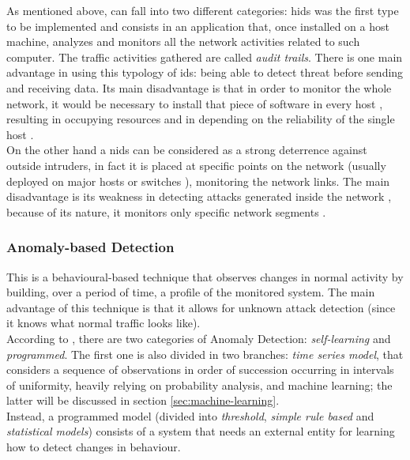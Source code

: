 As mentioned above,  can fall into two different categories: \gls{hids} was the first type to be implemented \cite{Debar1999} and consists in an application that, once installed on a host machine, analyzes and monitors all the network activities related to such computer. The traffic activities gathered are called \textit{audit trails}. There is one main advantage in using this typology of \gls{ids}: being able to detect threat before sending and receiving data. Its main disadvantage is that in order to monitor the whole network, it would be necessary to install that piece of software in every host \cite{Hodo2017}, resulting in occupying resources and in depending on the reliability of the single host \cite{Liu2019}. \\ On the other hand a \gls{nids} can be considered as a strong deterrence against outside intruders, in fact it is placed at specific points on the network (usually deployed on major hosts or switches \cite{Liu2019}), monitoring the network links. The main disadvantage is its weakness in detecting attacks generated inside the network \cite{Hodo2017}, because of its nature, it monitors only specific network segments \cite{Liu2019}.

\subsubsection{Anomaly-based Detection}
\label{subsubsec:anomaly-detection}

This is a behavioural-based technique that observes changes in normal activity by building, over a period of time, a profile of the monitored system. The main advantage of this technique is that it allows for unknown attack detection (since it knows what normal traffic looks like). \\ According to \cite{Hodo2017}, there are two categories of Anomaly Detection: \textit{self-learning} and \textit{programmed}. The first one is also divided in two branches: \textit{time series model}, that considers a sequence of observations in order of succession occurring in intervals of uniformity, heavily relying on probability analysis, and machine learning; the latter  will be discussed in section \ref{sec:machine-learning}. \\ Instead, a programmed model (divided into \textit{threshold}, \textit{simple rule based} and \textit{statistical models}) consists of a system that needs an external entity for learning how to detect changes in behaviour.

